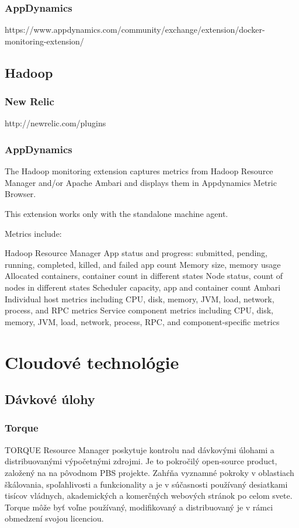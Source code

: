 \documentclass[11pt,final,oneside]{fithesis}
\begin{document}
\subsection{AppDynamics}
https://www.appdynamics.com/community/exchange/extension/docker-monitoring-extension/


\section{Hadoop}
\subsection{New Relic}
http://newrelic.com/plugins

\subsection{AppDynamics}
The Hadoop monitoring extension captures metrics from Hadoop Resource Manager and/or Apache Ambari and displays them in Appdynamics Metric Browser.

This extension works only with the standalone machine agent.


Metrics include:

Hadoop Resource Manager
App status and progress: submitted, pending, running, completed, killed, and failed app count
Memory size, memory usage
Allocated containers, container count in different states
Node status, count of nodes in different states
Scheduler capacity, app and container count
Ambari
Individual host metrics including CPU, disk, memory, JVM, load, network, process, and RPC metrics
Service component metrics including CPU, disk, memory, JVM, load, network, process, RPC, and component-specific metrics
\cite{17}

\chapter{Cloudové technológie}

\section{Dávkové úlohy}
\subsection{Torque}
TORQUE Resource Manager poskytuje kontrolu nad dávkovými úlohami a distribuovanými výpočetnými zdrojmi. Je to pokročilý open-source product, založený na na pôvodnom PBS projekte. 
Zahŕňa vyznamné pokroky v oblastiach škálovania, spoľahlivosti a funkcionality a je v súčasnosti používaný desiatkami tisícov vládnych, akademických a komerčných webových stránok po celom svete. Torque môže byť voľne používaný, modifikovaný a distribuovaný je v rámci obmedzení svojou licenciou.\cite{torque}
\end{document}

